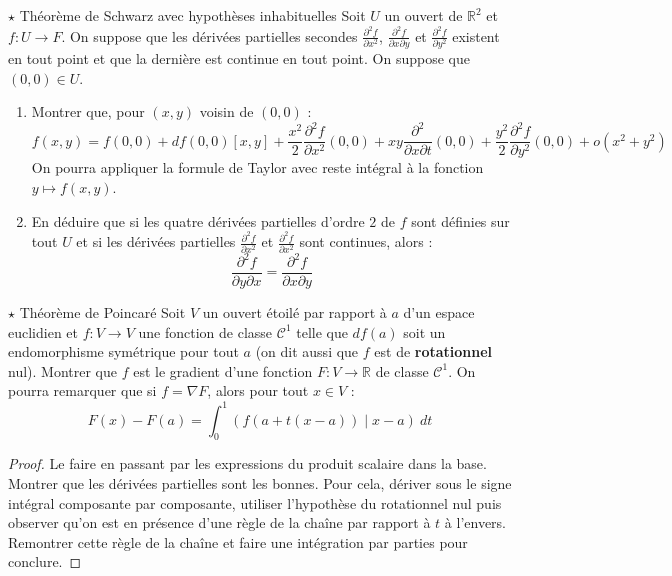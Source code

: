 \documentclass[french,a4paper]{article}
\newcommand{\R}{\mathbb{R}}
\theoremstyle{plain}
\theoremstyle{definition}
\theoremstyle{remark}
\begin{document}
\begin{ex}[Moulin.30]{$\star$ Théorème de Schwarz avec hypothèses inhabituelles}
	Soit $U$ un ouvert de $\R^2$ et $f:U\to F$. On suppose que les dérivées partielles secondes $\displaystyle\frac{\partial^2f}{\partial x^2}$, $\displaystyle\frac{\partial^2f}{\partial x\partial y}$ et $\displaystyle\frac{\partial^2f}{\partial y^2}$ existent en tout point et que la dernière est continue en tout point. On suppose que $(0,0)\in U$.
	\begin{enumerate}
		\item Montrer que, pour $(x,y)$ voisin de $(0,0)$ : $$f(x,y)=f(0,0)+df(0,0)[x,y]+\frac{x^2}{2}\frac{\partial^2 f}{\partial x^2}(0,0)+xy\frac{\partial^2}{\partial x\partial t}(0,0)+\frac{y^2}{2}\frac{\partial^2 f}{\partial y^2}(0,0)+o(x^2+y^2)$$ On pourra appliquer la formule de Taylor avec reste intégral à la fonction $y\mapsto f(x,y)$.
		\item En déduire que si les quatre dérivées partielles d'ordre $2$ de $f$ sont définies sur tout $U$ et si les dérivées partielles $\displaystyle\frac{\partial^2f}{\partial x^2}$ et $\displaystyle\frac{\partial^2f}{\partial x^2}$ sont continues, alors : $$\displaystyle\frac{\partial^2f}{\partial y\partial x}=\displaystyle\frac{\partial^2f}{\partial x\partial y}$$
	\end{enumerate}
\end{ex}

\begin{ex}[Moulin.31]{$\star$ Théorème de Poincaré}
	Soit $V$ un ouvert étoilé par rapport à $a$ d'un espace euclidien et $f:V\to V$ une fonction de classe $\mathcal{C}^1$ telle que $df(a)$ soit un endomorphisme symétrique pour tout $a$ (on dit aussi que $f$ est de \textbf{rotationnel} nul). Montrer que $f$ est le gradient d'une fonction $F:V\to\R$ de classe $\mathcal{C}^1$. On pourra remarquer que si $f=\nabla F$, alors pour tout $x\in V$ : $$F(x)-F(a)=\int_{0}^{1}\left(f(a+t(x-a))\mid x-a\right)\ dt$$
\end{ex}
\begin{proof}
	Le faire en passant par les expressions du produit scalaire dans la base. Montrer que les dérivées partielles sont les bonnes. Pour cela, dériver sous le signe intégral composante par composante, utiliser l'hypothèse du rotationnel nul puis observer qu'on est en présence d'une règle de la chaîne par rapport à $t$ à l'envers. Remontrer cette règle de la chaîne et faire une intégration par parties pour conclure.
\end{proof}
\end{document}
